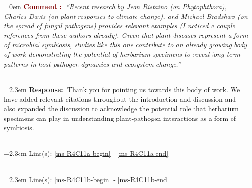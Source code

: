 \documentclass[12pt]{article}
\newcounter{cN}
\newcommand{\comment}[1]{
	\vspace{2em}
	\refstepcounter{cN} %
	\noindent \hangindent=0em \textbf{\textcolor{Maroon}{\uline{Comment \thecN}:~}}\emph{``#1''}
	}
\newcommand{\response}[1]{
	\\[0.25em]
	\hangindent=2.3em \textbf{\textcolor{NavyBlue}{\uline{Response}:~}}#1
	}
\newcommand{\linesref}[2]{
		\\[0.25em]
	\hangindent=2.3em {\color{Mahogany} Line(s): \ref{#1} - \ref{#2}}
}
\begin{document}
\comment{Recent research by Jean Ristaino (on Phytophthora), Charles Davis (on plant responses to climate change), and Michael Bradshaw (on the spread of fungal pathogens) provides relevant examples (I noticed a couple references from these authors already). Given that plant diseases represent a form of microbial symbiosis, studies like this one contribute to an already growing body of work demonstrating the potential of herbarium specimens to reveal long-term patterns in host-pathogen dynamics and ecosystem change.}
\response{Thank you for pointing us towards this body of work. We have added relevant citations throughout the introduction and discussion and also expanded the discussion to acknowledge the potential role that herbarium specimens can play in understanding plant-pathogen interactions as a form of symbiosis.}
\linesref{ms-R4C11a-begin}{ms-R4C11a-end}
\linesref{ms-R4C11b-begin}{ms-R4C11b-end}



 








\end{document}
